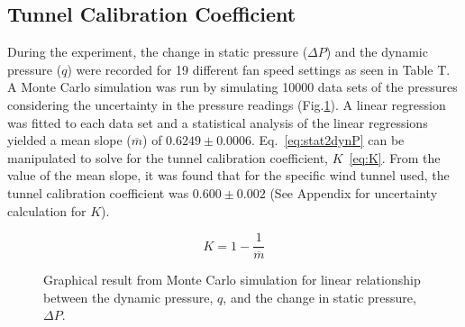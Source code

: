 \documentclass[journal,letterpaper]{IEEEtran}
\begin{document}
\subsection{Tunnel Calibration Coefficient}

During the experiment, the change in static pressure ($\Delta P$) and the dynamic pressure ($q$) were recorded for 19 different fan speed settings as seen in Table T.
A Monte Carlo simulation was run by simulating 10000 data sets of the pressures considering the uncertainty in the pressure readings (Fig.\ref{fig:Monte}).
A linear regression was fitted to each data set and a statistical analysis of the linear regressions yielded a mean slope ($\overline{m}$) of $0.6249 \pm 0.0006$.
Eq.~\eqref{eq:stat2dynP} can be manipulated to solve for the tunnel calibration coefficient, $K$~\eqref{eq:K}.
From the value of the mean slope, it was found that for the specific wind tunnel used, the tunnel calibration coefficient was $0.600 \pm 0.002$ (See Appendix for uncertainty calculation for $K$).

\begin{equation} \label{eq:K}
    K = 1 - \frac{1}{\overline{m}}
\end{equation}

\begin{figure}[H]
    \centering
    \caption{Graphical result from Monte Carlo simulation for linear relationship between the dynamic pressure, $q$, and the change in static pressure, $\Delta P$.}
    \label{fig:Monte}
\end{figure}
\end{document}
